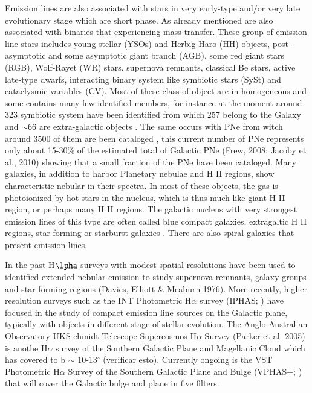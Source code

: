 \documentclass[fleqn,usenatbib]{mnras}
\begin{document}
Emission lines are also associated with stars in very early-type and/or very late evolutionary stage which are short phase. As already mentioned are also associated with binaries that experiencing mass transfer. These group of emission line stars includes young stellar (YSOs) and Herbig-Haro (HH) objects, post-asymptotic and some asymptotic giant branch (AGB), some red giant stars (RGB), Wolf-Rayet (WR) stars, supernova remnants, classical Be stars, active late-type dwarfs, interacting binary system like symbiotic stars (SySt) and cataclysmic variables (CV). Most of these class of object are in-homogeneous and some contains many few identified members, for instance at the moment around 323 symbiotic system have been identified from which 257 belong to the Galaxy and  $\sim$66 are extra-galactic objects \citep{Akras:2019a}. The same occurs with PNe from witch around 3500 of them are been cataloged \citep{Parker:2016}, this current number of PNe represents only about 15-30\% of the estimated total of Galactic PNe (Frew, 2008; Jacoby et al., 2010) showing that a small fraction of the PNe have been cataloged. Many galaxies, in addition to harbor Planetary nebulae and H II regions, show characteristic nebular in their spectra. In most of these objects, the gas is photoionized by hot stars in the nucleus, which is thus much like giant H II region, or perhaps many H II regions. The galactic nucleus with very strongest  emission lines of this type are often called blue compact galaxies, extragaltic H II regions, star forming or starburst galaxies \citep{Osterbrock:2006}. There are also spiral galaxies that present emission lines.

In the past H$\lpha$ surveys with modest spatial resolutions have been used to identified extended nebular emission to study supernova remnants, galaxy groups and star forming regions (Davies, Elliott & Meaburn 1976). More recently, higher resolution surveys such as the INT Photometric H$\alpha$ survey (IPHAS; \citealt{Drew:2005, Barentsen:2014}) have focused in the study of compact emission line sources on the Galactic plane, typically with objects in different stage of stellar evolution. The Anglo-Australian Observatory UKS chmidt Telescope Supercosmos H$\alpha$ Survey (Parker et al. 2005) is anothe H{$\alpha$} survey of the Southern Galactic Plane and Magellanic Cloud which has covered to b $\sim$ 10-13$^{\circ}$ (verificar esto). Currently ongoing is the VST Photometric H$\alpha$ Survey of the Southern Galactic Plane and Bulge (VPHAS+; \citealt{Drew:2014}) that will cover the Galactic bulge and plane in five filters. 
\end{document}
